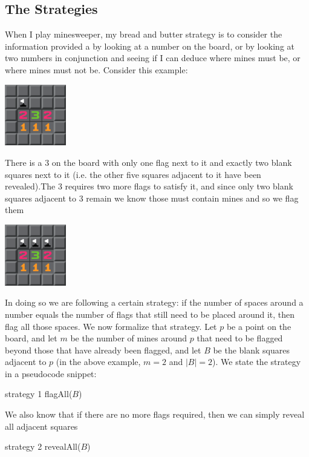 \documentclass{article}
\theoremstyle{definition}
\theoremstyle{definition}
\theoremstyle{theorem}
\begin{document}
	\subsection*{The Strategies}
	When I play minesweeper, my bread and butter strategy is to consider the information provided a by looking at a number on the board, or by looking at two numbers in conjunction and seeing if I can deduce where mines must be, or where mines must not be. Consider this example:
	\begin{center}
		\includegraphics[width=0.2\textwidth]{exampleimages/example1a}
	\end{center}
	 There is a 3 on the board with only one flag next to it and exactly two blank squares next to it (i.e. the other five squares adjacent to it have been revealed).The 3 requires two more flags to satisfy it, and since only two blank squares adjacent to 3 remain we know those must contain mines and so we flag them
	\begin{center}
		\includegraphics[width=0.2\textwidth]{exampleimages/example1b}
	\end{center}
	In doing so we are following a certain strategy: if the number of spaces around a number equals the number of flags that still need to be placed around it, then flag all those spaces. We now formalize that strategy. Let $p$ be a point on the board, and let $m$ be the number of mines around $p$ that need to be flagged beyond those that have already been flagged, and let $B$ be the blank squares adjacent to $p$ (in the above example, $m = 2$ and $|B| = 2$). We state the strategy in a pseudocode snippet:
	\begin{algorithmic}
		 \Comment strategy 1
		\State flagAll($B$)
		\EndIf
	\end{algorithmic}
	We also know that if there are no more flags required, then we can simply reveal all adjacent squares
	\begin{algorithmic}
		 \Comment strategy 2
		\State revealAll($B$)
		\EndIf
	\end{algorithmic}
	
\end{document}
